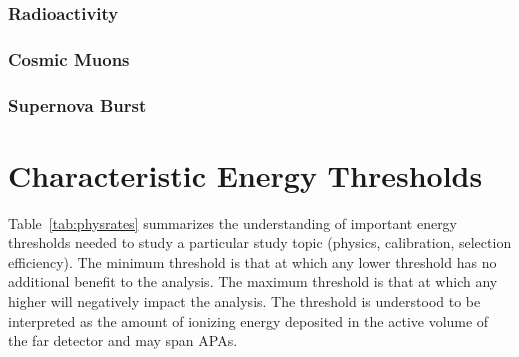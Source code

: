 

\subsubsection{Radioactivity}

\subsubsection{Cosmic Muons}

\subsubsection{Supernova Burst}


\section{Characteristic Energy Thresholds}


Table~\ref{tab:physrates} summarizes the understanding of important
energy thresholds needed to study a particular study topic (physics,
calibration, selection efficiency).
The minimum threshold is that at which any lower threshold has no
additional benefit to the analysis.
The maximum threshold is that at which any higher will negatively
impact the analysis.
The threshold is understood to be interpreted as the amount of
ionizing energy deposited in the active volume of the far detector
and may span APAs.

